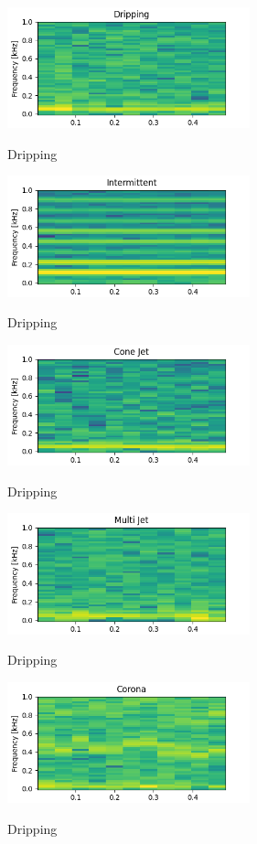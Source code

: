 \begin{multicols}{2}

\begin{figure}[H]
    \center
    \includegraphics[width=7cm]{Figuras/spectogram/308_Dripping.png}
    \label{fig:spectrogram1}
    \caption{Dripping}
  \end{figure}

  \begin{figure}[H]
    \center
    \includegraphics[width=7cm]{Figuras/spectogram/486_Intermittent.png}
    \label{fig:spectrogram5}
    \caption{Dripping}
  \end{figure}

  \begin{figure}[H]
    \center
    \includegraphics[width=7cm]{Figuras/spectogram/94_Cone Jet.png}
    \label{fig:spectrogram2}
    \caption{Dripping}
  \end{figure}

  \begin{figure}[H]
    \center
    \includegraphics[width=7cm]{Figuras/spectogram/166_Multi Jet.png}
    \label{fig:spectrogram3}
    \caption{Dripping}
  \end{figure}

  \begin{figure}[H]
    \center
    \includegraphics[width=7cm]{Figuras/spectogram/276_Corona.png}
    \label{fig:spectrogram4}
    \caption{Dripping}
  \end{figure}

\end{multicols}